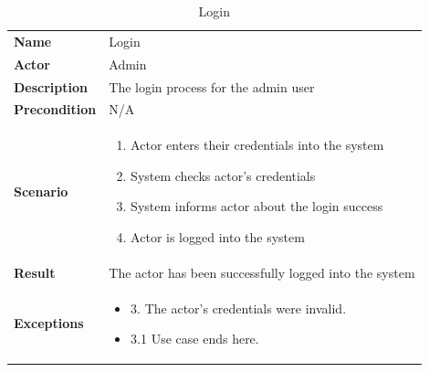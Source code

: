 \begin{table}[ht]
    \caption{Login}
    \begin{tabular}{|L{5cm}|L{10cm}|}
        \toprule
        \textbf{Name}         & Login                                                  \\
        \textbf{Actor}        & Admin                                                  \\
        \textbf{Description}  & The login process for the admin user                   \\
        \textbf{Precondition} & N/A                                                    \\
        \textbf{Scenario} &
        \vspace{-0.75cm}
        \begin{enumerate}
            \setlength\itemsep{-0.5em}
            \item Actor enters their credentials into the system
            \item System checks actor's credentials
            \item System informs actor about the login success
            \item Actor is logged into the system
        \end{enumerate} \\[-0.5cm]
        \textbf{Result}       & The actor has been successfully logged into the system \\
        \textbf{Exceptions} &
        \vspace{-0.75cm}
        \begin{itemize}
            \setlength\itemsep{-0.5em}
            \item 3. The actor's credentials were invalid.
            \item 3.1 Use case ends here.
        \end{itemize} \\
        \bottomrule
    \end{tabular}
    \label{tab:table28}
\end{table}

